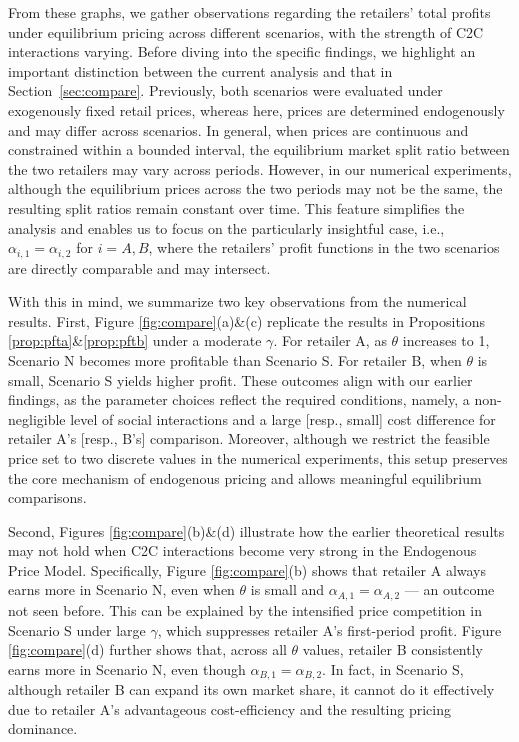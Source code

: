\documentclass[nonblindrev,copyedit]{informs1}
\begin{document}
From these graphs, we gather observations regarding the retailers' total profits under equilibrium pricing across different scenarios, with the strength of C2C interactions varying.
Before diving into the specific findings, we highlight an important distinction between the current analysis and that in Section~\ref{sec:compare}. Previously, both scenarios were evaluated under exogenously fixed retail prices, whereas here, prices are determined endogenously and may differ across scenarios. In general, when prices are continuous and constrained within a bounded interval, the equilibrium market split ratio between the two retailers may vary across periods. However, in our numerical experiments, although the equilibrium prices across the two periods may not be the same, the resulting split ratios remain constant over time. This feature simplifies the analysis and enables us to focus on the particularly insightful case, i.e., $\alpha_{i,1} = \alpha_{i,2}$ for $i = A, B$, where the retailers' profit functions in the two scenarios are directly comparable and may intersect.

With this in mind, we summarize two key observations from the numerical results. First, Figure \ref{fig:compare}(a)\&(c) replicate the results in Propositions \ref{prop:pfta}\&\ref{prop:pftb} under a moderate $\gamma$. For retailer A, as $\theta$ increases to 1, Scenario N becomes more profitable than Scenario S. For retailer B, when $\theta$ is small, Scenario S yields higher profit. These outcomes align with our earlier findings, as the parameter choices reflect the required conditions, namely, a non-negligible level of social interactions and a large [resp., small] cost difference for retailer A’s [resp., B’s] comparison. Moreover, although we restrict the feasible price set to two discrete values in the numerical experiments, this setup preserves the core mechanism of endogenous pricing and allows meaningful equilibrium comparisons.

Second, Figures \ref{fig:compare}(b)\&(d) illustrate how the earlier theoretical results may not hold when C2C interactions become very strong in the Endogenous Price Model. Specifically, Figure \ref{fig:compare}(b) shows that retailer A always earns more in Scenario N, even when $\theta$ is small and $\alpha_{A,1} = \alpha_{A,2}$ --- an outcome not seen before. This can be explained by the intensified price competition in Scenario S under large $\gamma$, which suppresses retailer A's first-period profit. Figure \ref{fig:compare}(d) further shows that, across all $\theta$ values, retailer B consistently earns more in Scenario N, even though $\alpha_{B,1} = \alpha_{B,2}$. In fact, in Scenario S, although retailer B can expand its own market share, it cannot do it effectively due to retailer A’s advantageous cost-efficiency and the resulting pricing dominance.
\end{document}
